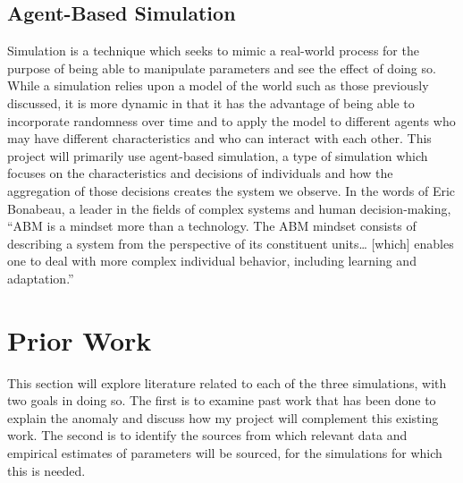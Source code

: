 \documentclass[10pt,twocolumn]{article}
\begin{document}
\subsection{Agent-Based Simulation}
Simulation is a technique which seeks to mimic a real-world process for the purpose of being able to manipulate parameters and see the effect of doing so. While a simulation relies upon a model of the world such as those previously discussed, it is more dynamic in that it has the advantage of being able to incorporate randomness over time and to apply the model to different agents who may have different characteristics and who can interact with each other. This project will primarily use agent-based simulation, a type of simulation which focuses on the characteristics and decisions of individuals and how the aggregation of those decisions creates the system we observe. In the words of Eric Bonabeau, a leader in the fields of complex systems and human decision-making, “ABM is a mindset more than a technology. The ABM mindset consists of describing a system from the perspective of its constituent units… [which] enables one to deal with more complex individual behavior, including learning and adaptation.”\cite{bonabeau}

\section{Prior Work}
This section will explore literature related to each of the three simulations, with two goals in doing so. The first is to examine past work that has been done to explain the anomaly and discuss how my project will complement this existing work. The second is to identify the sources from which relevant data and empirical estimates of parameters will be sourced, for the simulations for which this is needed.
\end{document}
